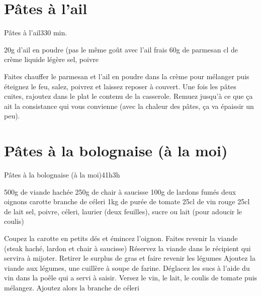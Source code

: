 {\section{Pâtes à l'ail}
\begin{recette}{Pâtes à l'ail}{3}{30 min.}{}
\begin{ingredients}
\ingredient 20g d'ail en poudre (pas le même  goût avec l'ail frais
\ingredient 60g de parmesan
 cl de crème liquide légère 
\ingredient sel, poivre
\end{ingredients}


\begin{preparation}
\etape Faites chauffer le parmesan et l'ail en poudre dans la crème pour mélanger puis éteignez le feu, salez, poivrez et laissez reposer à couvert.
\etape Une fois les pâtes cuites, rajoutez dans le plat le contenu de la casserole. Remuez jusqu'à ce que ça ait la consistance qui vous convienne (avec la chaleur des pâtes, ça va épaissir un peu).
\end{preparation}
\end{recette}

\section{Pâtes à la bolognaise (à la moi)}
\begin{recette}{Pâtes à la bolognaise (à la moi)}{4}{1h}{3h}
\begin{ingredients}
\ingredient 500g de viande hachée
\ingredient 250g de chair à saucisse
\ingredient 100g de lardons fumés
\ingredient deux oignons
 carotte
 branche de céleri
\ingredient 1kg de purée de tomate
\ingredient 25cl de vin rouge
\ingredient 25cl de lait
\ingredient sel, poivre, céleri, laurier (deux feuilles), sucre ou lait (pour adoucir le coulis)
\end{ingredients}

\begin{preparation}
\etape Coupez la carotte en petits dés et émincez l'oignon.
\etape Faites revenir la viande (steak haché, lardon et chair à saucisse)
\etape Réservez la viande dans le récipient qui servira à mijoter. 
\etape Retirer le surplus de gras et faire revenir les légumes
\etape Ajoutez la viande aux légumes, une cuillère à soupe de farine.
\etape Déglacez les sucs à l'aide du vin dans la poêle qui a servi à saisir. 
\etape Versez le vin, le lait, le coulis de tomate puis mélangez. Ajoutez alors la branche de céleri
\end{preparation}



\end{recette}}
